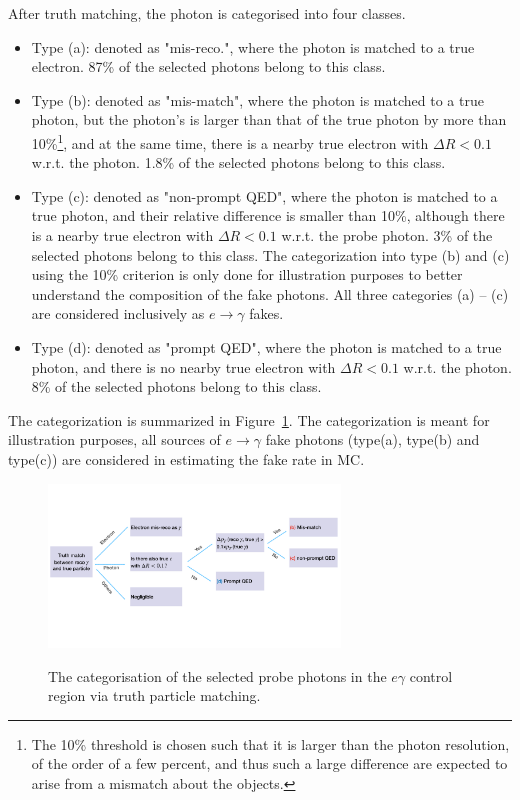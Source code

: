 After truth matching, the photon is categorised into four classes.
\begin{itemize}
\item Type (a): denoted as "mis-reco.", where the photon is matched to a true electron. 87\% of the selected photons belong to this class.
\item Type (b): denoted as "mis-match", where the photon is matched to a true photon, but the photon's \pt is larger than that of the true photon by more than 10\%\footnote{The 10\% threshold is chosen such that it is larger than the photon \pt resolution, of the order of a few percent, and thus such a large difference are expected to arise from a mismatch about the objects.}, and at the same time, there is a nearby true electron with $\Delta R < 0.1$ w.r.t. the photon. 1.8\% of the selected photons belong to this class.
\item Type (c): denoted as "non-prompt QED", where the photon is matched to a true photon, and their relative \pt difference is smaller than 10\%, although there is a nearby true electron with $\Delta R < 0.1$ w.r.t. the probe photon. 3\% of the selected photons belong to this class. The categorization into type (b) and (c) using the 10\% criterion is only done for illustration purposes to better understand the composition of the fake photons. All three categories (a) -- (c) are considered inclusively as $e\rightarrow \gamma$ fakes. %

\item Type (d): denoted as "prompt QED", where the photon is matched to a true photon, and there is no nearby true electron with $\Delta R < 0.1$ w.r.t. the photon. 8\% of the selected photons belong to this class. 
\end{itemize}

The categorization is summarized in Figure~\ref{fig:egammafake_classes}. The categorization is meant for illustration purposes, all sources of $e\rightarrow \gamma$ fake photons (type(a), type(b) and type(c)) are considered in estimating the fake rate in MC. 


\begin{figure}[!htbp]
\centering
{\includegraphics[width=0.69\textwidth]{figures/egammafakes/efake_truth_matching.pdf}}
\caption [] {The categorisation of the selected probe photons in the $e\gamma$ control region via truth particle matching.}
\label{fig:egammafake_classes}
\end{figure}  

